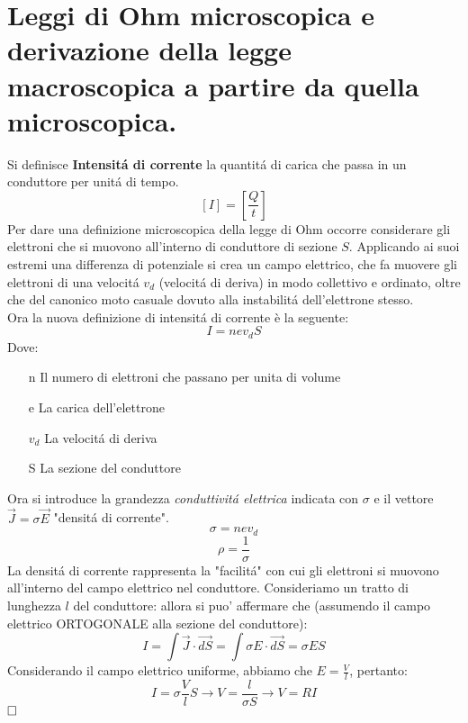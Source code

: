 \section{Leggi di Ohm microscopica e derivazione della legge
	macroscopica a partire da quella microscopica.}
Si definisce \textbf{Intensit\'a di corrente} la quantit\'a di carica che passa in un conduttore per unit\'a di tempo.
$$ [I] = \left[\frac{Q}{t}\right] $$
Per dare una definizione microscopica della legge di Ohm occorre considerare gli elettroni che si muovono all'interno di conduttore di sezione $S$. Applicando ai suoi estremi una differenza di potenziale si crea un campo elettrico, che fa muovere gli elettroni di una velocit\'a $v_d$ (velocit\'a di deriva) in modo collettivo e ordinato, oltre che del canonico moto casuale dovuto alla instabilit\'a dell'elettrone stesso.\\
Ora la nuova definizione di intensit\'a di corrente \`e la seguente:
$$
I = n e v_d S
$$
Dove:
\begin{itemize}
	\item [n] {Il numero di elettroni che passano per unita di volume}
	\item [e] {La carica dell'elettrone}
	\item [$v_d$] {La velocit\'a di deriva}
	\item [S] {La sezione del conduttore}
\end{itemize}
Ora si introduce la grandezza \textit{conduttivit\'a elettrica} indicata con $\sigma$ e il vettore $\vec{J} = \sigma \vec{E}$ "densit\'a di corrente".\\
$$
    \sigma = n e v_d
$$
$$
    \rho = \frac{1}{\sigma}
$$
La densit\'a di corrente rappresenta la "facilit\'a" con cui gli elettroni si muovono all'interno del campo elettrico nel conduttore.
Consideriamo un tratto di lunghezza $l$ del conduttore: allora si puo' affermare che (assumendo il campo elettrico ORTOGONALE alla sezione del conduttore):
$$
    I = \int{\vec{J} \cdot \vec{dS}} = \int{\sigma E \cdot \vec{dS}} = \sigma E S
$$
Considerando il campo elettrico uniforme, abbiamo che $E = \frac{V}{l}$, pertanto:
$$
    I = \sigma \frac{V}{l}S \rightarrow V = \frac{l}{\sigma S} \rightarrow V = RI
$$
$\hfill\square$